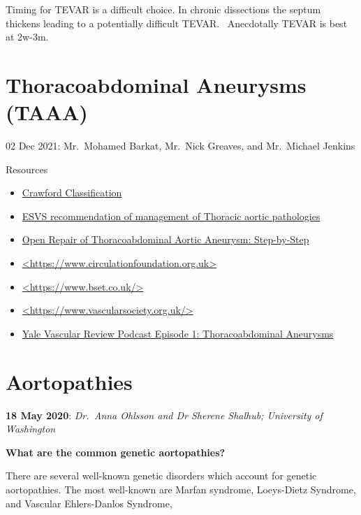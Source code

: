 \documentclass[
]{book}
\begin{document}
Timing for TEVAR is a difficult choice. In chronic dissections the
septum thickens leading to a potentially difficult TEVAR. ~Anecdotally
TEVAR is best at 2w-3m.

\hypertarget{thoracoabdominal-aneurysms-taaa}{%
\section{Thoracoabdominal Aneurysms (TAAA)}\label{thoracoabdominal-aneurysms-taaa}}

02 Dec 2021: Mr.~Mohamed Barkat, Mr.~Nick Greaves, and Mr.~Michael
Jenkins

Resources

\begin{itemize}
\item
  \href{https://pubmed.ncbi.nlm.nih.gov/3951025/}{Crawford
  Classification}
\item
  \href{https://www.esvs.org/wp-content/uploads/2015/12/Consensus-document-ESVS-EATCS-Aortic-Arch.pdf}{ESVS recommendation of management of Thoracic aortic
  pathologies}
\item
  \href{https://www.optechtcs.com/article/S1522-2942(18)30073-4/fulltext}{Open Repair of Thoracoabdominal Aortic Aneurysm:
  Step-by-Step}
\item
  \href{https://www.circulationfoundation.org.uk/}{\textless https://www.circulationfoundation.org.uk\textgreater{}}
\item
  \href{https://www.bset.co.uk/}{\textless https://www.bset.co.uk/\textgreater{}}
\item
  \href{https://www.vascularsociety.org.uk/}{\textless https://www.vascularsociety.org.uk/\textgreater{}}
\item
  \href{https://podcasts.apple.com/us/podcast/yale-vascular-review/id1587352652}{Yale Vascular Review Podcast Episode 1: Thoracoabdominal
  Aneurysms}
\end{itemize}

\hypertarget{aortopathies}{%
\section{Aortopathies}\label{aortopathies}}

\textbf{18 May 2020}: \emph{Dr.~Anna Ohlsson and Dr Sherene Shalhub; University of
Washington}

\textbf{What are the common genetic aortopathies?}

There are several well-known genetic disorders which account for genetic
aortopathies. The most well-known are Marfan syndrome, Loeys-Dietz
Syndrome, and Vascular Ehlers-Danlos Syndrome,
\end{document}
